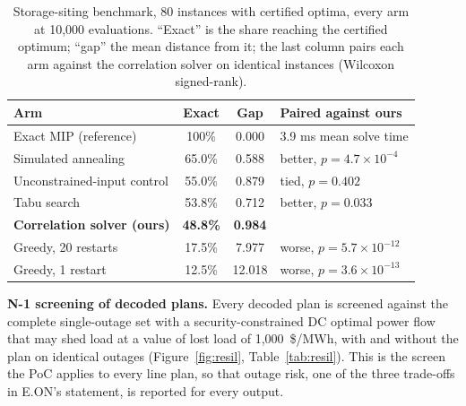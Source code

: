 \documentclass[10pt,a4paper]{article}
\begin{document}
\begin{table}[h]
\centering
\caption{Storage-siting benchmark, 80 instances with certified optima, every
arm at 10,000 evaluations. ``Exact'' is the share reaching the certified
optimum; ``gap'' the mean distance from it; the last column pairs each arm
against the correlation solver on identical instances (Wilcoxon signed-rank).}
\label{tab:bench}
\begin{tabular}{lccl}
\toprule
Arm & Exact & Gap & Paired against ours \\
\midrule
Exact MIP (reference) & 100\% & 0.000 & 3.9 ms mean solve time \\
Simulated annealing & 65.0\% & 0.588 & better, $p=4.7\times10^{-4}$ \\
Unconstrained-input control & 55.0\% & 0.879 & tied, $p=0.402$ \\
Tabu search & 53.8\% & 0.712 & better, $p=0.033$ \\
\textbf{Correlation solver (ours)} & \textbf{48.8\%} & \textbf{0.984} & \\
Greedy, 20 restarts & 17.5\% & 7.977 & worse, $p=5.7\times10^{-12}$ \\
Greedy, 1 restart & 12.5\% & 12.018 & worse, $p=3.6\times10^{-13}$ \\
\bottomrule
\end{tabular}
\end{table}

\textbf{N-1 screening of decoded plans.} Every decoded plan is screened
against the complete single-outage set with a security-constrained DC optimal
power flow that may shed load at a value of lost load of 1,000~\$/MWh, with
and without the plan on identical outages (Figure~\ref{fig:resil},
Table~\ref{tab:resil}). This is the screen the PoC applies to every line
plan, so that outage risk, one of the three trade-offs in E.ON's statement, is
reported for every output.
\end{document}
